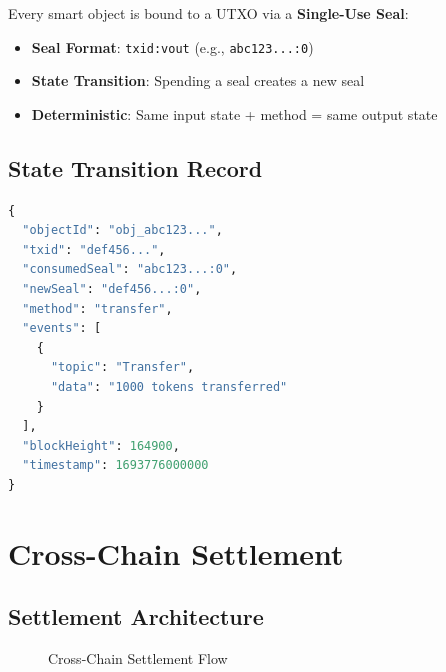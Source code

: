 \documentclass[a4paper,11pt]{article}
\begin{document}
Every smart object is bound to a UTXO via a \textbf{Single-Use Seal}:

\begin{itemize}
    \item \textbf{Seal Format}: \texttt{txid:vout} (e.g., \texttt{abc123...:0})
    \item \textbf{State Transition}: Spending a seal creates a new seal
    \item \textbf{Deterministic}: Same input state + method = same output state
\end{itemize}

\subsection{State Transition Record}

\begin{lstlisting}[language=Python, caption={State Transition}]
{
  "objectId": "obj_abc123...",
  "txid": "def456...",
  "consumedSeal": "abc123...:0",
  "newSeal": "def456...:0",
  "method": "transfer",
  "events": [
    {
      "topic": "Transfer",
      "data": "1000 tokens transferred"
    }
  ],
  "blockHeight": 164900,
  "timestamp": 1693776000000
}
\end{lstlisting}

\section{Cross-Chain Settlement}

\subsection{Settlement Architecture}

\begin{figure}[h]
\centering
{}
\caption{Cross-Chain Settlement Flow}
\end{figure}
\end{document}
